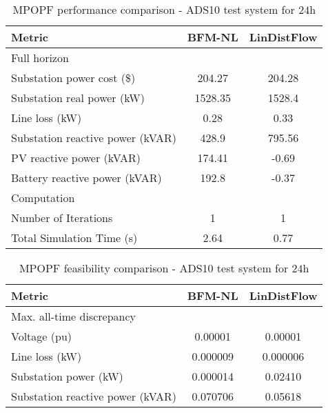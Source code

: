 \documentclass[../../outputs/main.tex]{subfiles}
\begin{document}
\begin{table}[t]
    \centering
    \caption{MPOPF performance comparison - ADS10 test system for $24$h}
    \begin{tabular}{|l|c|c|}
    \hline
    \textbf{Metric} & \textbf{BFM-NL} & \textbf{LinDistFlow} \\ \hline
    Full horizon  & \multicolumn{2}{c|}{} \\ \hline
    \quad Substation power cost (\$) & 204.27 & 204.28 \\ \hline
    \quad Substation real power (kW) & 1528.35 & 1528.4 \\ \hline
    \quad Line loss (kW) & 0.28 & 0.33 \\ \hline
    \quad Substation reactive power (kVAR) & 428.9 & 795.56 \\ \hline
    \quad PV reactive power (kVAR) & 174.41 & -0.69 \\ \hline
    \quad Battery reactive power (kVAR) & 192.8 & -0.37 \\ \hline
    Computation  & \multicolumn{2}{c|}{} \\ \hline
    \quad Number of Iterations & 1 & 1 \\ \hline
    \quad Total Simulation Time (s) & 2.64 & 0.77 \\ \hline
    \end{tabular}
    \label{table:mpopf-perf-ads10}
    \vspace{-3mm}
\end{table}

\begin{table}[t]
    \centering
    \caption{MPOPF feasibility comparison - ADS10 test system for $24$h}
    \begin{tabular}{|l|c|c|}
    \hline
    \textbf{Metric} & \textbf{BFM-NL} & \textbf{LinDistFlow} \\ \hline
    Max. all-time discrepancy & \multicolumn{2}{c|}{} \\ \hline
    \quad Voltage (pu) & 0.00001 & 0.00001 \\ \hline
    \quad Line loss (kW) & 0.000009 & 0.000006 \\ \hline
    \quad Substation power (kW) & 0.000014 & 0.02410 \\ \hline
    \quad Substation reactive power (kVAR) & 0.070706 & 0.05618 \\ \hline
    \end{tabular}
    \label{table:mpopf-feas-ads10}
    \vspace{-3mm}
\end{table}
\end{document}
